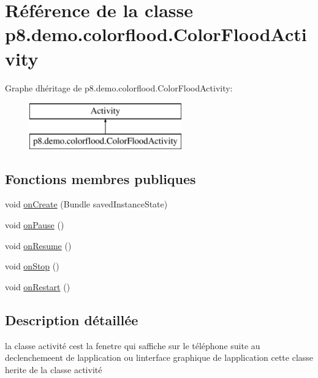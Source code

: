 \hypertarget{classp8_1_1demo_1_1colorflood_1_1_color_flood_activity}{}\section{Référence de la classe p8.\+demo.\+colorflood.\+Color\+Flood\+Activity}
\label{classp8_1_1demo_1_1colorflood_1_1_color_flood_activity}
Graphe d\textquotesingle{}héritage de p8.\+demo.\+colorflood.\+Color\+Flood\+Activity\+:\begin{figure}[H]
\begin{center}
\leavevmode
\includegraphics[height=2.000000cm]{classp8_1_1demo_1_1colorflood_1_1_color_flood_activity}
\end{center}
\end{figure}
\subsection*{Fonctions membres publiques}
\begin{DoxyCompactItemize}
\item 
void \hyperlink{classp8_1_1demo_1_1colorflood_1_1_color_flood_activity_a34e116c4a353266c0356fa19ff850307}{on\+Create} (Bundle saved\+Instance\+State)
\item 
void \hyperlink{classp8_1_1demo_1_1colorflood_1_1_color_flood_activity_af318bc90e1d129cc573184b92c4f1331}{on\+Pause} ()
\item 
void \hyperlink{classp8_1_1demo_1_1colorflood_1_1_color_flood_activity_ab94cb3fb2a0c95a3cf6eb2cde0535877}{on\+Resume} ()
\item 
void \hyperlink{classp8_1_1demo_1_1colorflood_1_1_color_flood_activity_a7c4b18f861611b81114183d34ed9bc4f}{on\+Stop} ()
\item 
void \hyperlink{classp8_1_1demo_1_1colorflood_1_1_color_flood_activity_a44048b3cc00c70ae3b49a1d925f06ac7}{on\+Restart} ()
\end{DoxyCompactItemize}


\subsection{Description détaillée}
la classe activité c\textquotesingle{}est la fenetre qui s\textquotesingle{}affiche sur le téléphone suite au declenchemeent de l\textquotesingle{}application ou l\textquotesingle{}interface graphique de l\textquotesingle{}application cette classe herite de la classe activité 

